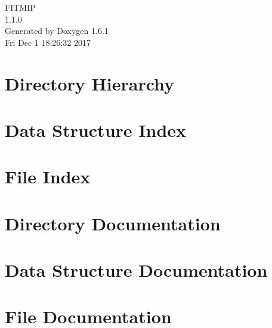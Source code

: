 \documentclass[a4paper]{book}
\begin{document}
\begin{titlepage}
\vspace*{7cm}
\begin{center}
{\Large FITMIP \\[1ex]\large 1.1.0 }\\
\vspace*{1cm}
{\large Generated by Doxygen 1.6.1}\\
\vspace*{0.5cm}
{\small Fri Dec 1 18:26:32 2017}\\
\end{center}
\end{titlepage}
\clearemptydoublepage
{}
\tableofcontents
\clearemptydoublepage
{}
\chapter{Directory Hierarchy}

\chapter{Data Structure Index}

\chapter{File Index}

\chapter{Directory Documentation}




\chapter{Data Structure Documentation}



\chapter{File Documentation}

\printindex
\end{document}
